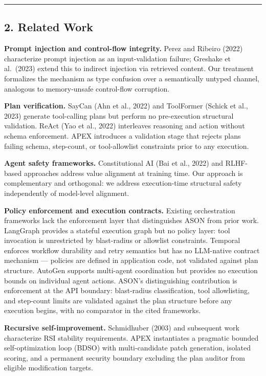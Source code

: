 \begin{center}\rule{0.5\linewidth}{0.5pt}\end{center}

\subsection{2. Related Work}\label{related-work}

\textbf{Prompt injection and control-flow integrity.} Perez and Ribeiro
(2022) characterize prompt injection as an input-validation failure;
Greshake et al.~(2023) extend this to indirect injection via retrieved
content. Our treatment formalizes the mechanism as type confusion over a
semantically untyped channel, analogous to memory-unsafe control-flow
corruption.

\textbf{Plan verification.} SayCan (Ahn et al., 2022) and ToolFormer
(Schick et al., 2023) generate tool-calling plans but perform no
pre-execution structural validation. ReAct (Yao et al., 2022)
interleaves reasoning and action without schema enforcement. APEX
introduces a validation stage that rejects plans failing schema,
step-count, or tool-allowlist constraints prior to any execution.

\textbf{Agent safety frameworks.} Constitutional AI (Bai et al., 2022)
and RLHF-based approaches address value alignment at training time. Our
approach is complementary and orthogonal: we address execution-time
structural safety independently of model-level alignment.

\textbf{Policy enforcement and execution contracts.} Existing
orchestration frameworks lack the enforcement layer that distinguishes
ASON from prior work. LangGraph provides a stateful execution graph but
no policy layer: tool invocation is unrestricted by blast-radius or
allowlist constraints. Temporal enforces workflow durability and retry
semantics but has no LLM-native contract mechanism --- policies are
defined in application code, not validated against plan structure.
AutoGen supports multi-agent coordination but provides no execution
bounds on individual agent actions. ASON's distinguishing contribution
is enforcement at the API boundary: blast-radius classification, tool
allowlisting, and step-count limits are validated against the plan
structure before any execution begins, with no comparator in the cited
frameworks.

\textbf{Recursive self-improvement.} Schmidhuber (2003) and subsequent
work characterize RSI stability requirements. APEX instantiates a
pragmatic bounded self-optimization loop (BDSO) with multi-candidate
patch generation, isolated scoring, and a permanent security boundary
excluding the plan auditor from eligible modification targets.

